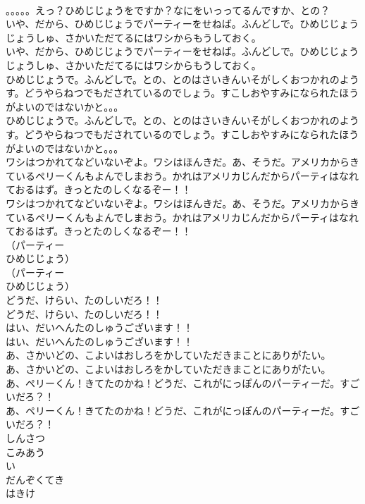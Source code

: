 \documentclass[8pt]{extreport}
\begin{document}
\begin{CJK}{UTF8}{min}
\\	。。。。。えっ？ひめじじょうをですか？なにをいっってるんですか、との？ 
\\	いや、だから、ひめじじょうでパーティーをせねば。ふんどしで。ひめじじょうじょうしゅ、さかいただてるにはワシからもうしておく。	
\\	いや、だから、ひめじじょうでパーティーをせねば。ふんどしで。ひめじじょうじょうしゅ、さかいただてるにはワシからもうしておく。 
\\	ひめじじょうで。ふんどしで。との、とのはさいきんいそがしくおつかれのようす。どうやらねつでもだされているのでしょう。すこしおやすみになられたほうがよいのではないかと。。。	
\\	ひめじじょうで。ふんどしで。との、とのはさいきんいそがしくおつかれのようす。どうやらねつでもだされているのでしょう。すこしおやすみになられたほうがよいのではないかと。。。 
\\	ワシはつかれてなどいないぞよ。ワシはほんきだ。あ、そうだ。アメリカからきているペリーくんもよんでしまおう。かれはアメリカじんだからパーティはなれておるはず。きっとたのしくなるぞー！！	
\\	ワシはつかれてなどいないぞよ。ワシはほんきだ。あ、そうだ。アメリカからきているペリーくんもよんでしまおう。かれはアメリカじんだからパーティはなれておるはず。きっとたのしくなるぞー！！ 
\\	（パーティー 
\\	ひめじじょう）	
\\	（パーティー 
\\	ひめじじょう） 
\\	どうだ、けらい、たのしいだろ！！	
\\	どうだ、けらい、たのしいだろ！！ 
\\	はい、だいへんたのしゅうございます！！	
\\	はい、だいへんたのしゅうございます！！ 
\\	あ、さかいどの、こよいはおしろをかしていただきまことにありがたい。	
\\	あ、さかいどの、こよいはおしろをかしていただきまことにありがたい。 
\\	あ、ペリーくん！きてたのかね！どうだ、これがにっぽんのパーティーだ。すごいだろ？！	
\\	あ、ペリーくん！きてたのかね！どうだ、これがにっぽんのパーティーだ。すごいだろ？！ 
\\	しんさつ
\\	こみあう
\\	い
\\	だんぞくてき
\\	はきけ

\end{CJK}
\end{document}
